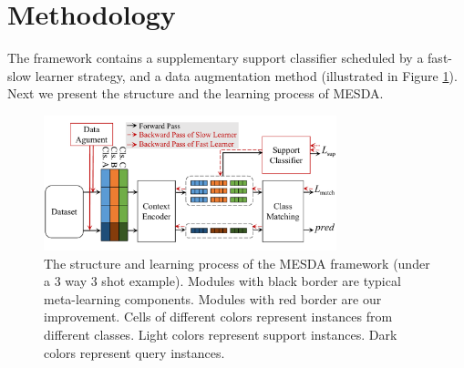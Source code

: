 \section{Methodology}
The framework contains a supplementary support classifier scheduled by
a fast-slow learner strategy, and a data augmentation method (illustrated in Figure \ref{fig:model}).
Next we present the structure and the learning process of MESDA.


\label{sec:Methodology}
\begin{figure}[ht]
    \centering
    \includegraphics[width=8.5cm]{model.pdf}
    \caption{The structure and learning process of the MESDA framework (under a 3 way 3 shot example). Modules with black border are typical meta-learning components. Modules with red border are our improvement. Cells of different colors represent instances from different classes. Light colors represent support instances. Dark colors represent query instances.
    }
    \label{fig:model}
\end{figure}



